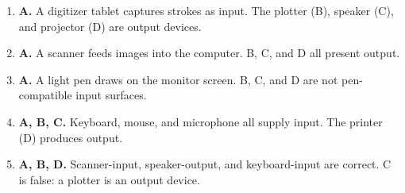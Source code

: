 \documentclass[11pt]{article}
\begin{document}
\begin{enumerate}[label=\textbf{Q\arabic*.}, leftmargin=*]
\item \textbf{A.} A digitizer tablet captures strokes as input. The plotter (B), speaker (C), and projector (D) are output devices.
\item \textbf{A.} A scanner feeds images into the computer. B, C, and D all present output.
\item \textbf{A.} A light pen draws on the monitor screen. B, C, and D are not pen-compatible input surfaces.
\item \textbf{A, B, C.} Keyboard, mouse, and microphone all supply input. The printer (D) produces output.
\item \textbf{A, B, D.} Scanner-input, speaker-output, and keyboard-input are correct. C is false: a plotter is an output device.
\end{enumerate}
\def\JKSSBLessonID{12}\def\JKSSBAnswers{1}
\end{document}
